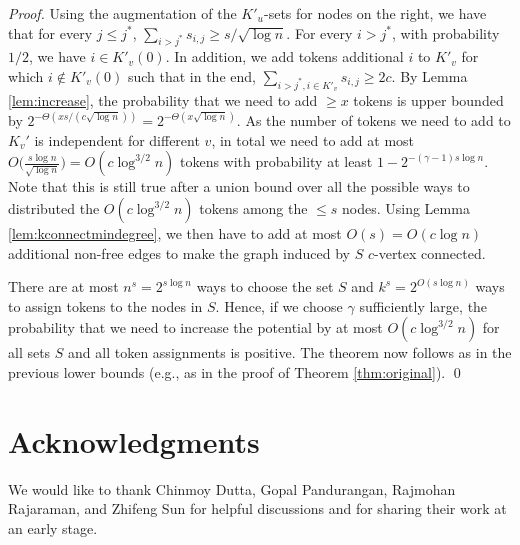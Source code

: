 \documentclass{llncs}
\begin{document}
\begin{proof}
    Using the augmentation of the $K'_u$-sets for nodes on the right,
    we have that for every $j\leq j^*$, $\sum_{i>j^*} s_{i,j}\geq
    s/\sqrt{\log n}$. For every $i>j^*$, with probability $1/2$, we
    have $i\in K'_v(0)$. In addition, we add tokens additional $i$ to
    $K'_v$ for which $i\not\in K'_v(0)$ such that in the end,
    $\sum_{i>j^*, i\in K'_v} s_{i,j}\geq 2c$. By Lemma
    \ref{lem:increase}, the probability that we need to add $\geq x$ tokens
    is upper bounded by $2^{-\Theta\left(xs/(c\sqrt{\log
                n})\right)}=2^{-\Theta\left(x\sqrt{\log
                n}\right)}$. As the number of tokens we need to add to
    $K_v'$ is independent for different $v$, in total we need to add
    at most $O\big(\frac{s\log n}{\sqrt{\log n}}\big) =
    O(c\log^{3/2}n)$ tokens with probability at least
    $1-2^{-(\gamma-1)s\log n}$. Note that this is still true after a
    union bound over all the possible ways to distributed the
    $O(c\log^{3/2}n)$ tokens among the $\leq s$ nodes. Using Lemma
    \ref{lem:kconnectmindegree}, we then have to add at most
    $O(s)=O(c\log n)$ additional non-free edges to make the graph
    induced by $S$ $c$-vertex connected.
        
    There are at most $n^s=2^{s\log n}$ ways  to choose the set $S$
    and $k^s=2^{O(s\log n)}$ ways to assign tokens to the nodes in
    $S$. Hence, if we choose $\gamma$ sufficiently large, the
    probability that we need to increase the potential by at most
    $O(c\log^{3/2} n)$ for all sets $S$ and all token assignments is
    positive. The theorem now follows as in the previous lower bounds
    (e.g., as in the proof of Theorem \ref{thm:original}).
\hspace*{\fill}\qed\end{proof}





\section*{Acknowledgments}

We would like to thank Chinmoy Dutta, Gopal Pandurangan, Rajmohan
Rajaraman, and Zhifeng Sun for helpful discussions and for sharing
their work at an early stage.

\clearpage


\end{document}
